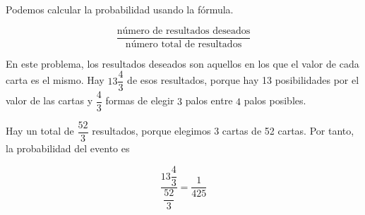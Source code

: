 Podemos calcular la probabilidad usando la fórmula.

$$\dfrac{\text{número de resultados deseados}}{\text{número total de resultados}}$$

En este problema, los resultados deseados son aquellos en los que el valor de
cada carta es el mismo. Hay $13\dfrac{4}{3}$ de esos resultados, porque hay 13 posibilidades por el valor de las cartas y $\dfrac{4}{3}$ formas de elegir $3$ palos entre $4$ palos posibles. 

Hay un total de $\dfrac{52}{3}$ resultados, porque elegimos 3 cartas de 52 cartas. Por tanto, la probabilidad del evento es

$$ \dfrac{13\dfrac{4}{3}}{\dfrac{52}{3}} = \dfrac{1}{425} $$  